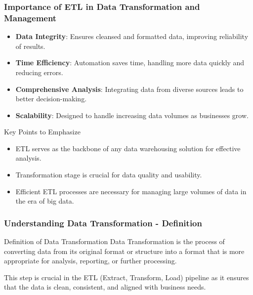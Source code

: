 \documentclass{beamer}
\begin{document}
\begin{frame}[fragile]
    \frametitle{Importance of ETL in Data Transformation and Management}
    \begin{itemize}
        \item \textbf{Data Integrity}: Ensures cleansed and formatted data, improving reliability of results.
        \item \textbf{Time Efficiency}: Automation saves time, handling more data quickly and reducing errors.
        \item \textbf{Comprehensive Analysis}: Integrating data from diverse sources leads to better decision-making.
        \item \textbf{Scalability}: Designed to handle increasing data volumes as businesses grow.
    \end{itemize}

    \begin{block}{Key Points to Emphasize}
        \begin{itemize}
            \item ETL serves as the backbone of any data warehousing solution for effective analysis.
            \item Transformation stage is crucial for data quality and usability.
            \item Efficient ETL processes are necessary for managing large volumes of data in the era of big data.
        \end{itemize}
    \end{block}
\end{frame}

\begin{frame}[fragile]
    \frametitle{Understanding Data Transformation - Definition}
    
    \begin{block}{Definition of Data Transformation}
        Data Transformation is the process of converting data from its original format or structure into a format that is more appropriate for analysis, reporting, or further processing. 
    \end{block}

    This step is crucial in the ETL (Extract, Transform, Load) pipeline as it ensures that the data is clean, consistent, and aligned with business needs.
\end{frame}
\end{document}
